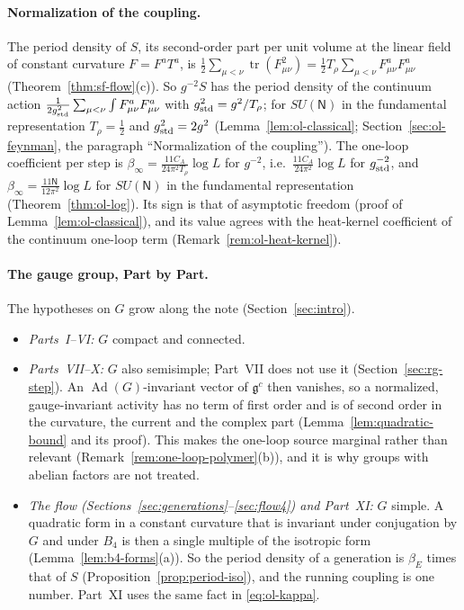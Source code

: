 \paragraph{Normalization of the coupling.} The period density of $S$, its second-order part per unit volume at the linear field of constant curvature $F=F^aT^a$, is $\frac12\sum_{\mu<\nu}\operatorname{tr}(F_{\mu\nu}^2)=\frac12T_\rho\sum_{\mu<\nu}F^a_{\mu\nu}F^a_{\mu\nu}$ (Theorem~\ref{thm:sf-flow}(c)). So $g^{-2}S$ has the period density of the continuum action $\frac1{2g_{\rm std}^2}\sum_{\mu<\nu}\int F^a_{\mu\nu}F^a_{\mu\nu}$ with $g_{\rm std}^2=g^2/T_\rho$; for $SU(\mathsf N)$ in the fundamental representation $T_\rho=\frac12$ and $g_{\rm std}^2=2g^2$ (Lemma~\ref{lem:ol-classical}; Section~\ref{sec:ol-feynman}, the paragraph ``Normalization of the coupling''). The one-loop coefficient per step is $\beta_\infty=\frac{11C_A}{24\pi^2T_\rho}\log L$ for $g^{-2}$, i.e.\ $\frac{11C_A}{24\pi^2}\log L$ for $g_{\rm std}^{-2}$, and $\beta_\infty=\frac{11\mathsf N}{12\pi^2}\log L$ for $SU(\mathsf N)$ in the fundamental representation (Theorem~\ref{thm:ol-log}). Its sign is that of asymptotic freedom (proof of Lemma~\ref{lem:ol-classical}), and its value agrees with the heat-kernel coefficient of the continuum one-loop term (Remark~\ref{rem:ol-heat-kernel}).

\paragraph{The gauge group, Part by Part.} The hypotheses on $G$ grow along the note (Section~\ref{sec:intro}).
\begin{itemize}
\item \emph{Parts~I--VI:} $G$ compact and connected.
\item \emph{Parts~VII--X:} $G$ also semisimple; Part~VII does not use it (Section~\ref{sec:rg-step}). An $\operatorname{Ad}(G)$-invariant vector of $\mathfrak g^c$ then vanishes, so a normalized, gauge-invariant activity has no term of first order and is of second order in the curvature, the current and the complex part (Lemma~\ref{lem:quadratic-bound} and its proof). This makes the one-loop source marginal rather than relevant (Remark~\ref{rem:one-loop-polymer}(b)), and it is why groups with abelian factors are not treated.
\item \emph{The flow (Sections~\ref{sec:generations}--\ref{sec:flow4}) and Part~XI:} $G$ simple. A quadratic form in a constant curvature that is invariant under conjugation by $G$ and under $B_4$ is then a single multiple of the isotropic form (Lemma~\ref{lem:b4-forms}(a)). So the period density of a generation is $\beta_E$ times that of $S$ (Proposition~\ref{prop:period-iso}), and the running coupling is one number. Part~XI uses the same fact in \eqref{eq:ol-kappa}.
\end{itemize}


